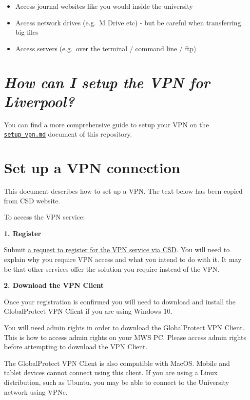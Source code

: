 \documentclass[
]{book}
\providecommand{\tightlist}{%
  \setlength{\itemsep}{0pt}\setlength{\parskip}{0pt}}
\begin{document}
\begin{itemize}
\tightlist
\item
  Access journal websites like you would inside the university
\item
  Access network drives (e.g.~M Drive etc) - but be careful when transferring big files
\item
  Access servers (e.g.~over the terminal / command line / ftp)
\end{itemize}

\hypertarget{how-can-i-setup-the-vpn-for-liverpool}{%
\section{\texorpdfstring{\emph{How can I setup the VPN for Liverpool?}}{How can I setup the VPN for Liverpool?}}\label{how-can-i-setup-the-vpn-for-liverpool}}

You can find a more comprehensive guide to setup your VPN on the
\href{setup_vpn.md}{\texttt{setup\_vpn.md}} document of this repository.

\hypertarget{set-up-a-vpn-connection}{%
\section{Set up a VPN connection}\label{set-up-a-vpn-connection}}

This document describes how to set up a VPN. The text below has been copied from CSD website.

To access the VPN service:

\textbf{1. Register}

Submit \href{https://liverpool.service-now.com/sp?id=sc_cat_item\&sys_id=bd8d37f1376ba60051a3532e53990e3f}{a request to register for the VPN service via CSD}. You will need to explain why you require VPN access and what you intend to do with it. It may be that other services offer the solution you require instead of the VPN.

\textbf{2. Download the VPN Client}

Once your registration is confirmed you will need to download and install the GlobalProtect VPN Client if you are using Windows 10.

You will need admin rights in order to download the GlobalProtect VPN Client. This is how to access admin rights on your MWS PC. Please access admin rights before attempting to download the VPN Client.

The GlobalProtect VPN Client is also compatible with MacOS. Mobile and tablet devices cannot connect using this client. If you are using a Linux distribution, such as Ubuntu, you may be able to connect to the University network using VPNc.
\end{document}
